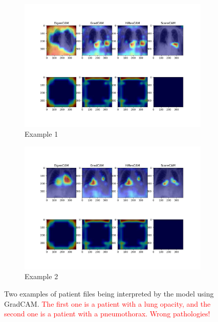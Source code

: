 \documentclass[11pt]{article}
\newcommand\myworries[1]{\textcolor{red}{#1}}
\begin{document}
        \begin{figure}[H]
                 \centering
                 \begin{subfigure}[b]{\textwidth}
                     \centering
                     \includegraphics[width=\textwidth]{plots/heatmaps_4}
                     \caption{Example 1}
                     \vspace{4ex}

                 \end{subfigure}
                 \hfill
                 \begin{subfigure}[b]{\textwidth}
                     \centering
                     \includegraphics[width=\textwidth]{plots/heatmaps_7}
                     \caption{Example 2}
                     \vspace{4ex}

                 \end{subfigure}
                 \label{fig:gradcam_example_chexpert_5}
                 \caption{Two examples of patient files being interpreted by the model using GradCAM. \myworries{The first one is a patient with a lung opacity, and the second one is a patient with a pneumothorax. Wrong pathologies!}}

            \end{figure}
\end{document}
